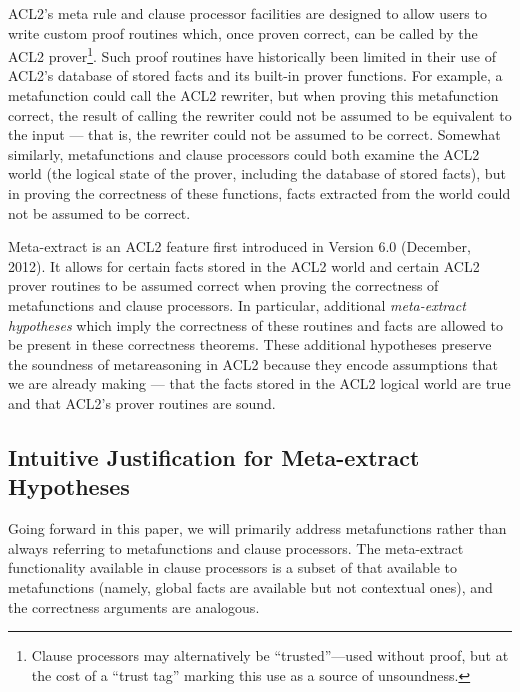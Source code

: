 ACL2's meta rule and clause processor facilities are designed to allow
users to write custom proof routines which, once proven
correct, can be called by the ACL2 prover\footnote{
  Clause processors may alternatively be ``trusted''---used without proof, but at the
  cost of a ``trust tag'' marking this use as a source of
  unsoundness.\cite{trusted-cl-proc}}.
Such proof routines have historically been limited in their use of
ACL2's database of stored facts and its built-in prover functions.
For example, a metafunction could call the ACL2 rewriter, but when
proving this metafunction correct, the result of calling the rewriter
could not be assumed to be equivalent to the input --- that is, the
rewriter could not be assumed to be correct.  Somewhat similarly,
metafunctions and clause processors could both examine the ACL2 world
(the logical state of the prover, including the database of stored
facts), but in proving the correctness of these functions, facts
extracted from the world could not be assumed to be correct.

Meta-extract is an ACL2 feature first introduced in Version 6.0
(December, 2012).  It allows for certain facts stored in the ACL2
world and certain ACL2 prover routines to be assumed
correct when proving the correctness of metafunctions and clause
processors.  In particular, additional \textit{meta-extract hypotheses}
which imply the correctness of these routines and facts are allowed to
be present in these correctness theorems. These additional hypotheses
preserve the soundness of metareasoning in ACL2 because they encode
assumptions that we are already
making --- that the facts stored in the ACL2 logical world are true
and that ACL2's prover routines are sound.

\subsection{Intuitive Justification for Meta-extract Hypotheses}

Going forward in this paper, we will primarily address metafunctions
rather than always referring to metafunctions and clause processors.
The meta-extract functionality available in clause processors is a
subset of that available to metafunctions (namely, global facts are
available but not contextual ones), and the correctness arguments are
analogous.

